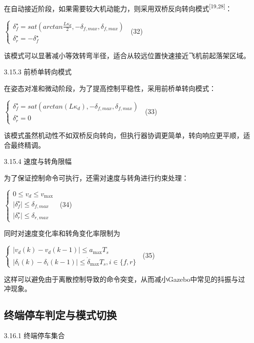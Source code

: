 在自动接近阶段，如果需要较大机动能力，则采用双桥反向转向模式\textsuperscript{[19,28]}：

\(\left\{ \begin{array}{r}
\delta_{f}^{\star} = sat\left( arctan\frac{L\kappa_{d}}{2}, - \delta_{f,max},\delta_{f,max} \right) \\
\delta_{r}^{\star} = - \delta_{f}^{\star}
\end{array} \right.\ \) (32)

该模式可以显著减小等效转弯半径，适合从较远位置快速接近飞机前起落架区域。

3.15.3 前桥单转向模式

在姿态对准和微动阶段，为了提高控制平稳性，采用前桥单转向模式：

\(\left\{ \begin{array}{r}
\delta_{f}^{\star} = sat\left( arctan(L\kappa_{d}), - \delta_{f,max},\delta_{f,max} \right) \\
\delta_{r}^{\star} = 0
\end{array} \right.\ \) (33)

该模式虽然机动性不如双桥反向转向，但执行器协调更简单，转向响应更平顺，适合最终精调。

3.15.4 速度与转角限幅

为了保证控制命令可执行，还需对速度与转角进行约束处理：

\(\left\{ \begin{array}{r}
0 \leq v_{d} \leq v_{\max} \\
 \mid \delta_{f}^{\star} \mid \leq \delta_{f,max} \\
 \mid \delta_{r}^{\star} \mid \leq \delta_{r,max}
\end{array} \right.\ \) (34)

同时对速度变化率和转角变化率限制为

\(\left\{ \begin{array}{r}
 \mid v_{d}(k) - v_{d}(k - 1) \mid \leq a_{\max}T_{s} \\
 \mid \delta_{i}(k) - \delta_{i}(k - 1) \mid \leq {\dot{\delta}}_{\max}T_{s},i \in \{ f,r\}
\end{array} \right.\ \) (35)

这样可以避免由于离散控制导致的命令突变，从而减小Gazebo中常见的抖振与过冲现象。

\subsection{终端停车判定与模式切换}

3.16.1 终端停车集合

